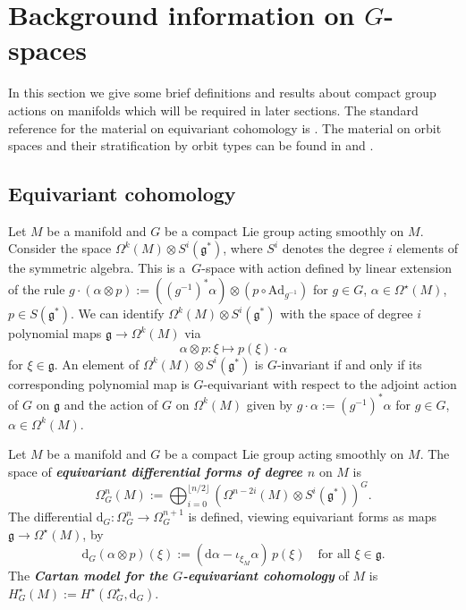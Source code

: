 \documentclass[pdftex]{sigma}
\numberwithin{equation}{section}
\newcommand{\deff}[1]{\textbf{\emph{#1}}}
\newcommand{\func}[3]{#1 \colon #2 \to #3}
\begin{document}
\section{Background information on $G$-spaces}\label{section2}

In this section we give some brief def\/initions and results about compact group actions on manifolds which will be required in later sections.  The standard reference for the material on equivariant cohomology is \cite{supersymmetry}.  The material on orbit spaces and their stratif\/ication by orbit types can be found in \cite[Chapter 2]{duis} and \cite[Chapter 2]{ortega-ratiu}.


\subsection{Equivariant cohomology}


Let $M$ be a manifold and $G$ be a compact Lie group acting smoothly on $M$.  Consider the space $\Omega^{k}(M) \otimes S^i(\mathfrak{g}^*)$, where $S^i$ denotes the degree $i$ elements of the symmetric algebra.  This is a~$G$-space with action def\/ined by linear extension of the rule $g \cdot (\alpha \otimes p) := \left( (g^{-1})^* \alpha \right) \otimes (p \circ \mathrm{Ad}_{g^{-1}})$ for $g \in G$, $\alpha \in \Omega^{\star}(M)$, $p \in S(\mathfrak{g}^*)$.  We can identify $\Omega^{k}(M) \otimes S^i(\mathfrak{g}^*)$ with the space of degree $i$ polynomial maps $\mathfrak{g} \to \Omega^k(M)$ via
\[
  \alpha \otimes p \colon \xi \mapsto p(\xi) \cdot \alpha
\]
for $\xi \in \mathfrak{g}$.  An element of $\Omega^{k}(M) \otimes S^i(\mathfrak{g}^*)$ is $G$-invariant if and only if its corresponding polynomial map is $G$-equivariant with respect to the adjoint action of $G$ on $\mathfrak{g}$ and the action of $G$ on $\Omega^k(M)$ given by $g \cdot \alpha := (g^{-1})^* \alpha$ for $g \in G$, $\alpha \in \Omega^k(M)$.


\begin{Definition}
Let $M$ be a manifold and $G$ be a compact Lie group acting smoothly on $M$.  The space of \deff{equivariant differential forms of degree $n$} on $M$ is
\[
  \Omega_G^n(M) := \bigoplus_{i=0}^{\lfloor n/2 \rfloor}
  \left( \Omega^{n-2i}(M) \otimes S^i(\mathfrak{g}^*) \right)^G.
\]
The dif\/ferential $\func{\mathrm{d}_G}{\Omega_G^n}{\Omega_G^{n+1}}$ is def\/ined, viewing equivariant forms as maps $\mathfrak{g} \to \Omega^{\star}(M)$, by
\[
  \mathrm{d}_G ( \alpha \otimes p )(\xi)
  :=
  \left( \mathrm{d} \alpha - \iota_{\xi_M} \alpha \right) \, p(\xi)
  \quad \text{for all } \xi \in \mathfrak{g}.
\]
The \deff{Cartan model for the $G$-equivariant cohomology} of $M$ is $H_G^{\star}(M) := H^{\star} (\Omega_G^{\star}, \mathrm{d}_G)$.
\end{Definition}
\end{document}

